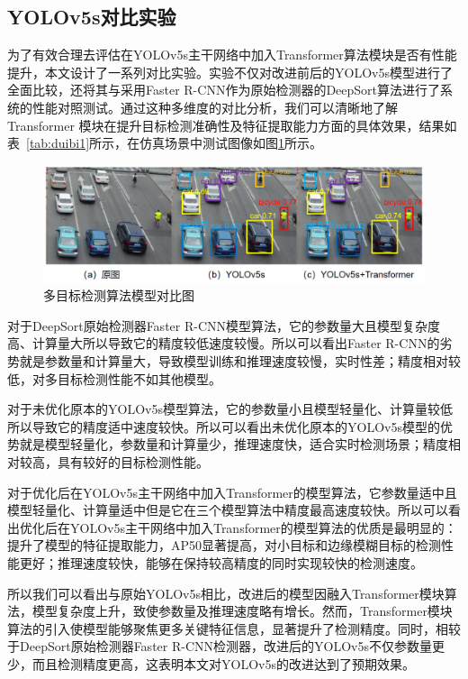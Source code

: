 \subsection{YOLOv5s对比实验}

为了有效合理去评估在YOLOv5s主干网络中加入Transformer算法模块是否有性能提升，本文设计了一系列对比实验。实验不仅对改进前后的YOLOv5s模型进行了全面比较，还将其与采用Faster R-CNN\cite{XDJS202421009}作为原始检测器的DeepSort算法进行了系统的性能对照测试。通过这种多维度的对比分析，我们可以清晰地了解 Transformer 模块在提升目标检测准确性及特征提取能力方面的具体效果，结果如表~\ref{tab:duibi1}所示，在仿真场景中测试图像如图\ref{fig:np11}所示。


\begin{figure}[htbp] %
	\centering
	\includegraphics[width=1\textwidth]{np11} %
	\caption{多目标检测算法模型对比图} %
	\label{fig:np11} %
\end{figure}



对于DeepSort原始检测器Faster R-CNN模型算法，它的参数量大且模型复杂度高、计算量大所以导致它的精度较低速度较慢。所以可以看出Faster R-CNN的劣势就是参数量和计算量大，导致模型训练和推理速度较慢，实时性差；精度相对较低，对多目标检测性能不如其他模型。

对于未优化原本的YOLOv5s模型算法，它的参数量小且模型轻量化、计算量较低所以导致它的精度适中速度较快。所以可以看出未优化原本的YOLOv5s模型的优势就是模型轻量化，参数量和计算量少，推理速度快，适合实时检测场景；精度相对较高，具有较好的目标检测性能。

对于优化后在YOLOv5s主干网络中加入Transformer的模型算法，它参数量适中且模型轻量化、计算量适中但是它在三个模型算法中精度最高速度较快。所以可以看出优化后在YOLOv5s主干网络中加入Transformer的模型算法的优质是最明显的：提升了模型的特征提取能力，AP50显著提高，对小目标和边缘模糊目标的检测性能更好；推理速度较快，能够在保持较高精度的同时实现较快的检测速度。

所以我们可以看出与原始YOLOv5s相比，改进后的模型因融入Transformer模块算法，模型复杂度上升，致使参数量及推理速度略有增长。然而，Transformer模块算法的引入使模型能够聚焦更多关键特征信息，显著提升了检测精度。同时，相较于DeepSort原始检测器Faster R-CNN检测器，改进后的YOLOv5s不仅参数量更少，而且检测精度更高，这表明本文对YOLOv5s的改进达到了预期效果。


